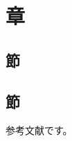 \documentclass[a5paper]{jsbook}
\begin{document}
\chapter{章}

\section{節}
\section{節}


\begin{thebibliography}{99}
参考文献です。



\end{thebibliography}

\end{document}
